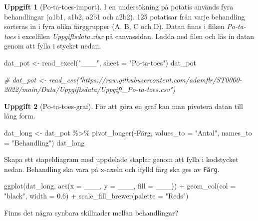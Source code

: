 \documentclass[
]{book}
\newenvironment{Shaded}{\begin{snugshade}}{\end{snugshade}}
\newcommand{\AttributeTok}[1]{\textcolor[rgb]{0.77,0.63,0.00}{#1}}
\newcommand{\CommentTok}[1]{\textcolor[rgb]{0.56,0.35,0.01}{\textit{#1}}}
\newcommand{\FloatTok}[1]{\textcolor[rgb]{0.00,0.00,0.81}{#1}}
\newcommand{\FunctionTok}[1]{\textcolor[rgb]{0.00,0.00,0.00}{#1}}
\newcommand{\NormalTok}[1]{#1}
\newcommand{\OtherTok}[1]{\textcolor[rgb]{0.56,0.35,0.01}{#1}}
\newcommand{\SpecialCharTok}[1]{\textcolor[rgb]{0.00,0.00,0.00}{#1}}
\newcommand{\StringTok}[1]{\textcolor[rgb]{0.31,0.60,0.02}{#1}}
\theoremstyle{definition}
\theoremstyle{definition}
\theoremstyle{definition}
\newtheorem{exercise}{Uppgift}[chapter]
\theoremstyle{definition}
\theoremstyle{remark}
\begin{document}
\begin{exercise}[Po-ta-toes-import]

I en undersökning på potatis används fyra behandlingar (a1b1, a1b2, a2b1 och a2b2). 125 potatisar från varje behandling sorteras in i fyra olika färggrupper (A, B, C och D). Datan finns i fliken \emph{Po-ta-toes} i excelfilen \emph{Uppgiftsdata.xlsx} på canvassidan. Ladda ned filen och läs in datan genom att fylla i stycket nedan.

\begin{Shaded}
\begin{Highlighting}[]
\NormalTok{dat\_pot }\OtherTok{\textless{}{-}} \FunctionTok{read\_excel}\NormalTok{(}\StringTok{"\_\_\_"}\NormalTok{, }\AttributeTok{sheet =} \StringTok{"Po{-}ta{-}toes"}\NormalTok{)}
\NormalTok{dat\_pot}

\CommentTok{\# dat\_pot \textless{}{-} read\_csv("https://raw.githubusercontent.com/adamflr/ST0060{-}2022/main/Data/Uppgiftsdata/Uppgift\_Po{-}ta{-}toes.csv")}
\end{Highlighting}
\end{Shaded}

\end{exercise}

\begin{exercise}[Po-ta-toes-graf]
För att göra en graf kan man pivotera datan till lång form.

\begin{Shaded}
\begin{Highlighting}[]
\NormalTok{dat\_long }\OtherTok{\textless{}{-}}\NormalTok{ dat\_pot }\SpecialCharTok{\%\textgreater{}\%} \FunctionTok{pivot\_longer}\NormalTok{(}\SpecialCharTok{{-}}\NormalTok{Färg, }\AttributeTok{values\_to =} \StringTok{"Antal"}\NormalTok{, }\AttributeTok{names\_to =} \StringTok{"Behandling"}\NormalTok{)}
\NormalTok{dat\_long}
\end{Highlighting}
\end{Shaded}

Skapa ett stapeldiagram med uppdelade staplar genom att fylla i kodstycket nedan. Behandling ska vara på x-axeln och ifylld färg ska ges av \texttt{Färg}.

\begin{Shaded}
\begin{Highlighting}[]
\FunctionTok{ggplot}\NormalTok{(dat\_long, }\FunctionTok{aes}\NormalTok{(}\AttributeTok{x =}\NormalTok{ \_\_\_, }\AttributeTok{y =}\NormalTok{ \_\_\_, }\AttributeTok{fill =}\NormalTok{ \_\_\_)) }\SpecialCharTok{+}
  \FunctionTok{geom\_col}\NormalTok{(}\AttributeTok{col =} \StringTok{"black"}\NormalTok{, }\AttributeTok{width =} \FloatTok{0.6}\NormalTok{) }\SpecialCharTok{+}
  \FunctionTok{scale\_fill\_brewer}\NormalTok{(}\AttributeTok{palette =} \StringTok{"Reds"}\NormalTok{)}
\end{Highlighting}
\end{Shaded}

Finns det några synbara skillnader mellan behandlingar?
\end{exercise}
\end{document}
